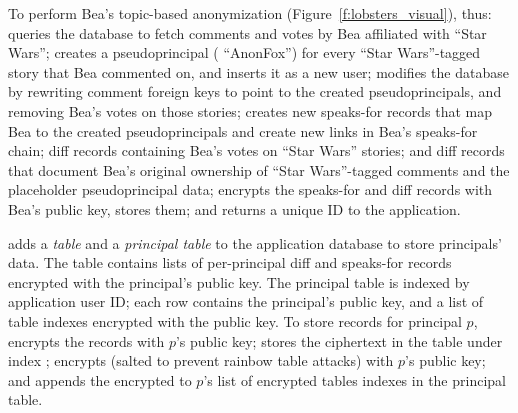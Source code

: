 %
To perform Bea's topic-based anonymization (Figure~\ref{f:lobsters_visual}),
\sys thus:
%
\one{} queries the database to fetch comments and votes by Bea
affiliated with ``Star Wars'';
%
\two{} creates a pseudoprincipal (\eg
``AnonFox'') for every ``Star Wars''-tagged story that Bea commented
on, and inserts it as a new user;
%
\three{} modifies the database by rewriting comment
foreign keys to point to the created pseudoprincipals, and
removing Bea's votes on those stories;
%
\four{} creates new speaks-for records that map Bea to the created
pseudoprincipals and create new links in Bea's speaks-for chain; diff records
containing Bea's votes on ``Star Wars'' stories; and diff records that document
Bea's original ownership of ``Star Wars''-tagged comments and the placeholder
pseudoprincipal data;
%
\five{} encrypts the speaks-for and diff records with Bea's public key, stores
them; and
%
\six{} returns a unique \xx ID to the application.

%
%
%

\sys adds a \emph{\xx table} and a \emph{principal table} to the application
database to store principals' \xxed data.
%
The \xx table contains lists of per-principal diff and speaks-for records encrypted with the
principal's public key.
%
%
The principal table is indexed by application user ID; each row contains the
principal's public key, and a list of \xx table indexes encrypted with the
public key.
%
To store records for principal $p$, \sys \one{} encrypts the records with
$p$'s public key; \two{} stores the ciphertext in the \xx table under index
; \three{} encrypts  (salted to
prevent rainbow table attacks) with $p$'s public key; and \four{} appends the
encrypted  to $p$'s list of encrypted \xx tables indexes
in the principal table.

